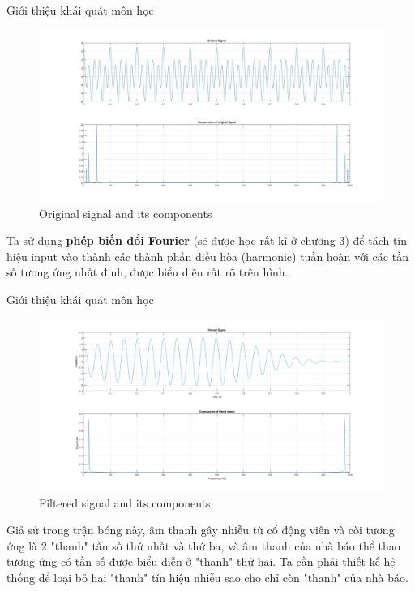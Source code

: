 \documentclass[8pt]{beamer}
\begin{document}
\begin{frame}{Giới thiệu khái quát môn học}
	\begin{figure}[h]
		\includegraphics[width=1\textwidth]{original.jpeg}
		\caption{Original signal and its components}
		\label{fig:re3}
	\end{figure}
Ta sử dụng \textbf{phép biến đổi Fourier} (sẽ được học rất kĩ ở chương 3) để tách tín hiệu input vào thành các thành phần điều hòa (harmonic) tuần hoàn với các tần số tương ứng nhất định, được biểu diễn rất rõ trên hình.
\end{frame}
\begin{frame}{Giới thiệu khái quát môn học}
	\begin{figure}[h]
		\includegraphics[width=1\textwidth]{filter.png}
		\caption{Filtered signal and its components}
		\label{fig:re4}
	\end{figure}
Giả sử trong trận bóng này, âm thanh gây nhiễu từ cổ động viên và còi tương ứng là 2 "thanh" tần số thứ nhất và thứ ba, và âm thanh của nhà báo thể thao tương ứng có tần số được biểu diễn ở "thanh" thứ hai. Ta cần phải thiết kế hệ thống để loại bỏ hai "thanh" tín hiệu nhiễu sao cho chỉ còn "thanh" của nhà báo.
\end{frame}
\end{document}
